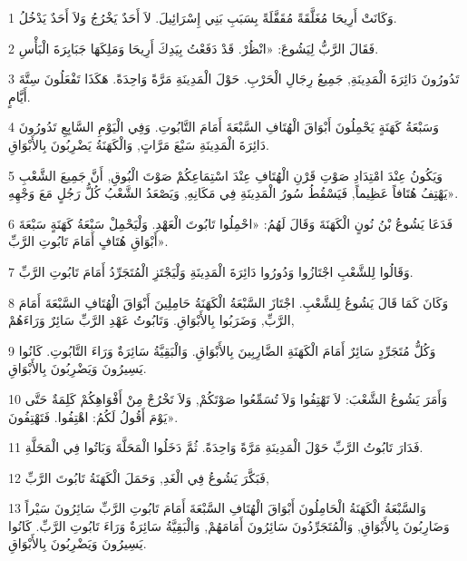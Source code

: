 \par 1 وَكَانَتْ أَرِيحَا مُغَلَّقَةً مُقَفَّلَةً بِسَبَبِ بَنِي إِسْرَائِيلَ. لاَ أَحَدٌ يَخْرُجُ وَلاَ أَحَدٌ يَدْخُلُ.
\par 2 فَقَالَ الرَّبُّ لِيَشُوعَ: «انْظُرْ. قَدْ دَفَعْتُ بِيَدِكَ أَرِيحَا وَمَلِكَهَا جَبَابِرَةَ الْبَأْسِ.
\par 3 تَدُورُونَ دَائِرَةَ الْمَدِينَةِ, جَمِيعُ رِجَالِ الْحَرْبِ. حَوْلَ الْمَدِينَةِ مَرَّةً وَاحِدَةً. هَكَذَا تَفْعَلُونَ سِتَّةَ أَيَّامٍ.
\par 4 وَسَبْعَةُ كَهَنَةٍ يَحْمِلُونَ أَبْوَاقَ الْهُتَافِ السَّبْعَةَ أَمَامَ التَّابُوتِ. وَفِي الْيَوْمِ السَّابِعِ تَدُورُونَ دَائِرَةَ الْمَدِينَةِ سَبْعَ مَرَّاتٍ, وَالْكَهَنَةُ يَضْرِبُونَ بِالأَبْوَاقِ.
\par 5 وَيَكُونُ عِنْدَ امْتِدَادِ صَوْتِ قَرْنِ الْهُتَافِ عِنْدَ اسْتِمَاعِكُمْ صَوْتَ الْبُوقِ, أَنَّ جَمِيعَ الشَّعْبِ يَهْتِفُ هُتَافاً عَظِيماً, فَيَسْقُطُ سُورُ الْمَدِينَةِ فِي مَكَانِهِ, وَيَصْعَدُ الشَّعْبُ كُلُّ رَجُلٍ مَعَ وَجْهِهِ».
\par 6 فَدَعَا يَشُوعُ بْنُ نُونٍ الْكَهَنَةَ وَقَالَ لَهُمُ: «احْمِلُوا تَابُوتَ الْعَهْدِ. وَلْيَحْمِلْ سَبْعَةُ كَهَنَةٍ سَبْعَةَ أَبْوَاقِ هُتَافٍ أَمَامَ تَابُوتِ الرَّبِّ».
\par 7 وَقَالُوا لِلشَّعْبِ اجْتَازُوا وَدُورُوا دَائِرَةَ الْمَدِينَةِ وَلْيَجْتَزِ الْمُتَجَرِّدُ أَمَامَ تَابُوتِ الرَّبِّ.
\par 8 وَكَانَ كَمَا قَالَ يَشُوعُ لِلشَّعْبِ. اجْتَازَ السَّبْعَةُ الْكَهَنَةُ حَامِلِينَ أَبْوَاقَ الْهُتَافِ السَّبْعَةَ أَمَامَ الرَّبِّ, وَضَرَبُوا بِالأَبْوَاقِ. وَتَابُوتُ عَهْدِ الرَّبِّ سَائِرٌ وَرَاءَهُمْ,
\par 9 وَكُلُّ مُتَجَرِّدٍ سَائِرٌ أَمَامَ الْكَهَنَةِ الضَّارِبِينَ بِالأَبْوَاقِ. وَالْبَقِيَّةُ سَائِرَةٌ وَرَاءَ التَّابُوتِ. كَانُوا يَسِيرُونَ وَيَضْرِبُونَ بِالأَبْوَاقِ.
\par 10 وَأَمَرَ يَشُوعُ الشَّعْبَ: لاَ تَهْتِفُوا وَلاَ تُسَمِّعُوا صَوْتَكُمْ, وَلاَ تَخْرُجْ مِنْ أَفْوَاهِكُمْ كَلِمَةٌ حَتَّى يَوْمَ أَقُولُ لَكُمُ: اهْتِفُوا. فَتَهْتِفُونَ».
\par 11 فَدَارَ تَابُوتُ الرَّبِّ حَوْلَ الْمَدِينَةِ مَرَّةً وَاحِدَةً. ثُمَّ دَخَلُوا الْمَحَلَّةَ وَبَاتُوا فِي الْمَحَلَّةِ.
\par 12 فَبَكَّرَ يَشُوعُ فِي الْغَدِ, وَحَمَلَ الْكَهَنَةُ تَابُوتَ الرَّبِّ,
\par 13 وَالسَّبْعَةُ الْكَهَنَةُ الْحَامِلُونَ أَبْوَاقَ الْهُتَافِ السَّبْعَةَ أَمَامَ تَابُوتِ الرَّبِّ سَائِرُونَ سَيْراً وَضَارِبُونَ بِالأَبْوَاقِ, وَالْمُتَجَرِّدُونَ سَائِرُونَ أَمَامَهُمْ, وَالْبَقِيَّةُ سَائِرَةٌ وَرَاءَ تَابُوتِ الرَّبِّ. كَانُوا يَسِيرُونَ وَيَضْرِبُونَ بِالأَبْوَاقِ.
